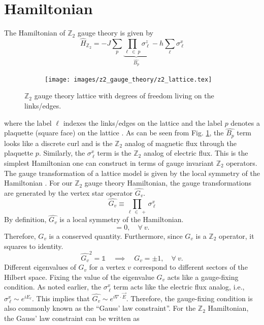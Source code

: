 \documentclass[../thesis_main.tex]{subfiles}
\begin{document}
\section{Hamiltonian}
The Hamiltonian of $\mathbb{Z}_2$ gauge theory is given by 
\begin{equation}
    \hat{H}_{\mathbb{Z}_2} = - J \sum_{p} \underbrace{\prod_{\ell \: \in \: p} \sigma^z_{\: \ell}}_{\hat{B_p}} \: - h \sum_{\ell} \sigma^x_{\: \ell}
\end{equation}
\begin{figure}[!htb]
    \centering
    \begin{subfigure}[b]{0.35\textwidth}  %
        \centering
        \texttt{[image: images/z2\_gauge\_theory/z2\_lattice.tex]}
    \end{subfigure}
    \caption{ $\mathbb{Z}_2$ gauge theory lattice with degrees of freedom living on the links/edges.}
    \label{z2_lattice}
\end{figure}
\!\!\!
where the label $\ell$ indexes the links/edges on the lattice and the label $p$ denotes a plaquette (square face) on the lattice \cite{JohnKogut_Intro_to_LGT}. As can be seen from Fig. \ref{z2_lattice}, the $\hat{B_p}$ term looks like a discrete curl and is the $\mathbb{Z}_2$ analog of magnetic flux through the plaquette $p$. Similarly, the $\sigma^x_{\: \ell}$ term is the $\mathbb{Z}_2$ analog of electric flux. This is the simplest Hamiltonian one can construct in terms of gauge invariant $\mathbb{Z}_2$ operators. 
The gauge transformation of a lattice model is given by the local symmetry of the Hamiltonian \cite{ZN_Hamiltonian_LGT}. For our $\mathbb{Z}_2$ gauge theory Hamiltonian, the gauge transformations are generated by the vertex star operator $\hat{G_v}$.
\begin{equation}
    \hat{G_v} \equiv \prod_{\ell \: \in \: +} \sigma^x_{\: \ell}
\end{equation}
By definition, $\hat{G_v}$ is a local symmetry of the Hamiltonian. 
\begin{equation}
    [\hat{G_v}, \hat{H}] = 0, \quad \forall \: v.
\end{equation}
Therefore, $G_v$ is a conserved quantity. Furthermore, since $G_v$ is a $\mathbb{Z}_2$ operator, it squares to identity.
\begin{equation}
    \hat{G_v}^2 = \mathds{1} \quad \implies \quad G_v = \pm 1, \quad \forall \: v.
\end{equation}    
Different eigenvalues of $G_v$ for a vertex $v$ correspond to different sectors of the Hilbert space. Fixing the value of the eigenvalue $G_v$ acts like a gauge-fixing condition. As noted earlier, the $\sigma^x_{\: \ell}$ term acts like the electric flux analog, i.e., $\sigma^x_{\: \ell} \sim e^{iE_\ell}$. This implies that $\hat{G_v} \sim e^{i \nabla \cdot \vec{E}}$. Therefore, the gauge-fixing condition is also commonly known as the ``Gauss' law constraint''. For the $\mathbb{Z}_2$ Hamiltonian, the Gauss' law constraint can be written as 
\end{document}
